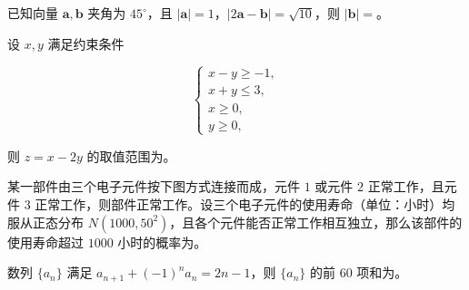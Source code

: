 \begin{question}
已知向量 $\boldsymbol a,\boldsymbol b$ 夹角为 $45^\circ$，且 $|\boldsymbol a|=1$，$|2\boldsymbol a-\boldsymbol b|=\sqrt{10}$，则 $|\boldsymbol b|=$\gkblank{}。

\end{question}
\begin{question}
设 $x,y$ 满足约束条件

\nopagebreak[4]
\[
\begin{cases}
x-y\geqslant-1,\\
x+y\leqslant3,\\
x\geqslant0,\\
y\geqslant0,
\end{cases}
\]

则 $z=x-2y$ 的取值范围为\gkblank{}。

\Needspace{0.4\textheight}
\end{question}
\begin{question}
某一部件由三个电子元件按下图方式连接而成，元件 $1$ 或元件 $2$ 正常工作，且元件 $3$ 正常工作，则部件正常工作。设三个电子元件的使用寿命（单位：小时）均服从正态分布 $N(1000,50^2)$，且各个元件能否正常工作相互独立，那么该部件的使用寿命超过 $1000$ 小时的概率为\gkblank{}。
\nopagebreak[4]
\begin{center}\end{center}
\nopagebreak[4]
\end{question}
\begin{question}
数列 $\{a_n\}$ 满足 $a_{n+1}+(-1)^n a_n=2n-1$，则 $\{a_n\}$ 的前 $60$ 项和为\gkblank{}。

\end{question}

